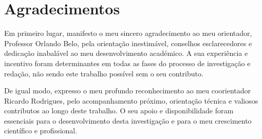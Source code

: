 \chapter*{Agradecimentos}
\setlength{\parskip}{1em}






Em primeiro lugar, manifesto o meu sincero agradecimento ao meu orientador, Professor Orlando Belo, pela orientação inestimável, conselhos esclarecedores e dedicação inabalável ao meu desenvolvimento académico. A sua experiência e incentivo foram determinantes em todas as fases do processo de investigação e redação, não sendo este trabalho possível sem o seu contributo.

De igual modo, expresso o meu profundo reconhecimento ao meu coorientador Ricardo Rodrigues, pelo acompanhamento próximo, orientação técnica e valiosos contributos ao longo deste trabalho. O seu apoio e disponibilidade foram essenciais para o desenvolvimento desta investigação e para o meu crescimento científico e profissional.


